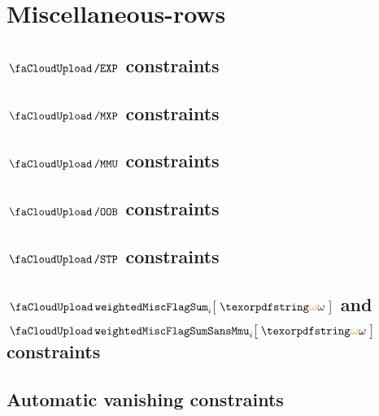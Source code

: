 \section{Miscellaneous-rows}
\subsection{$\miscSignifier\separator\expMod$                                                                                   constraints \lispDone{}}  \label{hub: miscellaneous constraints: exp}                  
\subsection{$\miscSignifier\separator\mxpMod$                                                                                   constraints }  \label{hub: miscellaneous constraints: mxp}                   %
\subsection{$\miscSignifier\separator\mmuMod$                                                                                   constraints \lispDone{}}  \label{hub: miscellaneous constraints: mmu}                  
\subsection{$\miscSignifier\separator\oobMod$                                                                                   constraints \lispDone{}}  \label{hub: miscellaneous constraints: oob}                  
\subsection{$\miscSignifier\separator\stpMod$                                                                                   constraints \lispDone{}}  \label{hub: miscellaneous constraints: stp}                  
\subsection{$\weightedMiscFlagSumName _{i}\big[\;\relof\;\big]$ and $\weightedMiscFlagSumSansMmuName _{i} \big[\;\relof\;\big]$ constraints }  \label{hub: miscellaneous constraints: weighted flag sum}     %
\subsection{Automatic vanishing                                                                                                 constraints }  \label{hub: miscellaneous constraints: automatic vanishing}   %
